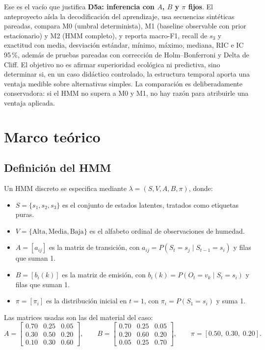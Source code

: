 \documentclass[11pt,a4paper]{article}
\begin{document}
Ese es el vacío que justifica \textbf{D5a: inferencia con \(A\), \(B\) y \(\pi\) fijos}. El anteproyecto aísla la decodificación del aprendizaje, usa secuencias sintéticas pareadas, compara M0 (umbral determinista), M1 (baseline observable con prior estacionario) y M2 (HMM completo), y reporta macro-F1, recall de \(s_3\) y exactitud con media, desviación estándar, mínimo, máximo, mediana, RIC e IC 95\,\%, además de pruebas pareadas con corrección de Holm--Bonferroni y Delta de Cliff. El objetivo no es afirmar superioridad ecológica ni predictiva, sino determinar si, en un caso didáctico controlado, la estructura temporal aporta una ventaja medible sobre alternativas simples. La comparación es deliberadamente conservadora: si el HMM no supera a M0 y M1, no hay razón para atribuirle una ventaja aplicada.

\section{Marco teórico}

\subsection{Definición del HMM}

Un HMM discreto se especifica mediante \(\lambda=(S,V,A,B,\pi)\), donde:
\begin{itemize}
  \item \(S=\{s_1,s_2,s_3\}\) es el conjunto de estados latentes, tratados como etiquetas puras.
  \item \(V=\{\text{Alta},\text{Media},\text{Baja}\}\) es el alfabeto ordinal de observaciones de humedad.
  \item \(A=[a_{ij}]\) es la matriz de transición, con \(a_{ij}=P(S_t=s_j\mid S_{t-1}=s_i)\) y filas que suman 1.
  \item \(B=[b_i(k)]\) es la matriz de emisión, con \(b_i(k)=P(O_t=v_k\mid S_t=s_i)\) y filas que suman 1.
  \item \(\pi=[\pi_i]\) es la distribución inicial en \(t=1\), con \(\pi_i=P(S_1=s_i)\) y suma 1.
\end{itemize}

Las matrices usadas son las del material del caso:
\begin{equation}
A=
\begin{bmatrix}
0.70 & 0.25 & 0.05\\
0.30 & 0.50 & 0.20\\
0.10 & 0.30 & 0.60
\end{bmatrix},
\qquad
B=
\begin{bmatrix}
0.70 & 0.25 & 0.05\\
0.20 & 0.60 & 0.20\\
0.05 & 0.25 & 0.70
\end{bmatrix},
\qquad
\pi=[0.50,\;0.30,\;0.20].
\end{equation}
\end{document}
